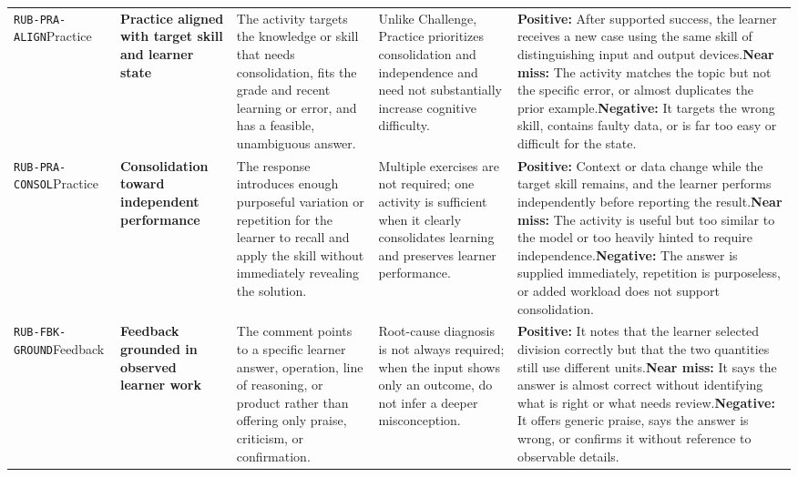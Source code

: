\documentclass[conference]{IEEEtran}
\begin{document}
\begin{longtable}{P{0.14\textwidth}P{0.17\textwidth}P{0.20\textwidth}P{0.17\textwidth}P{0.24\textwidth}}
\texttt{RUB-PRA-ALIGN}\newline{}Practice & \textbf{Practice aligned with target skill and learner state} & The activity targets the knowledge or skill that needs consolidation, fits the grade and recent learning or error, and has a feasible, unambiguous answer. & Unlike Challenge, Practice prioritizes consolidation and independence and need not substantially increase cognitive difficulty. & \textbf{Positive:} After supported success, the learner receives a new case using the same skill of distinguishing input and output devices.\newline\textbf{Near miss:} The activity matches the topic but not the specific error, or almost duplicates the prior example.\newline\textbf{Negative:} It targets the wrong skill, contains faulty data, or is far too easy or difficult for the state. \\
\texttt{RUB-PRA-CONSOL}\newline{}Practice & \textbf{Consolidation toward independent performance} & The response introduces enough purposeful variation or repetition for the learner to recall and apply the skill without immediately revealing the solution. & Multiple exercises are not required; one activity is sufficient when it clearly consolidates learning and preserves learner performance. & \textbf{Positive:} Context or data change while the target skill remains, and the learner performs independently before reporting the result.\newline\textbf{Near miss:} The activity is useful but too similar to the model or too heavily hinted to require independence.\newline\textbf{Negative:} The answer is supplied immediately, repetition is purposeless, or added workload does not support consolidation. \\
\texttt{RUB-FBK-GROUND}\newline{}Feedback & \textbf{Feedback grounded in observed learner work} & The comment points to a specific learner answer, operation, line of reasoning, or product rather than offering only praise, criticism, or confirmation. & Root-cause diagnosis is not always required; when the input shows only an outcome, do not infer a deeper misconception. & \textbf{Positive:} It notes that the learner selected division correctly but that the two quantities still use different units.\newline\textbf{Near miss:} It says the answer is almost correct without identifying what is right or what needs review.\newline\textbf{Negative:} It offers generic praise, says the answer is wrong, or confirms it without reference to observable details. \\

\end{longtable}
\end{document}
